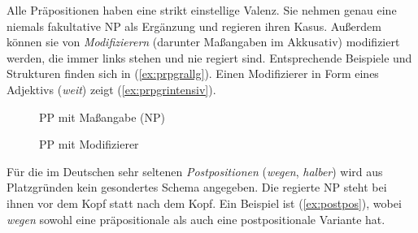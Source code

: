 
Alle Präpositionen haben eine strikt einstellige Valenz.
Sie nehmen genau eine niemals fakultative NP als Ergänzung und regieren ihren Kasus.
Außerdem können sie von \textit{Modifizierern} (darunter Maßangaben im Akkusativ) modifiziert werden, die immer links stehen und nie regiert sind.
Entsprechende Beispiele und Strukturen finden sich in (\ref{ex:prpgrallg}).
Einen Modifizierer in Form eines Adjektivs (\textit{weit}) zeigt (\ref{ex:prpgrintensiv}).

\begin{exe}
  \ex\label{ex:prpgrallg}
  \begin{xlist}
  \end{xlist}
\end{exe}

\begin{figure}[!htbp]
  \centering
  \caption{PP mit Maßangabe (NP)}
  \label{fig:prpgrmitakkmod}
\end{figure}

\begin{figure}[!htbp]
  \centering
  \caption{PP mit Modifizierer}
  \label{fig:prpgrmitadvmod}
\end{figure}


Für die im Deutschen sehr seltenen \textit{Postpositionen} (\zB \textit{wegen}, \textit{halber}) wird aus Platzgründen kein gesondertes Schema angegeben.
Die regierte NP steht bei ihnen vor dem Kopf statt nach dem Kopf.
Ein Beispiel ist (\ref{ex:postpos}), wobei \textit{wegen} sowohl eine präpositionale als auch eine postpositionale Variante hat.

